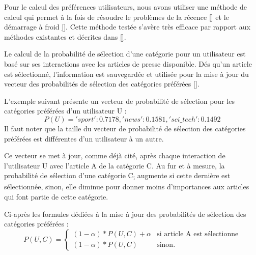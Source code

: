         Pour le calcul des préférences utilisateurs, nous avons utiliser une méthode de calcul qui permet à la fois de résoudre le problèmes de la récence \autoref{} et le démarrage à froid \autoref{}. Cette méthode testée s'avère très efficace par rapport aux méthodes existantes et décrites dans \autoref{}.

        Le calcul de la probabilité de sélection d'une catégorie pour un utilisateur est basé sur ses interactions avec les articles de presse disponible. Dés qu'un article est sélectionné, l'information est sauvegardée et utilisée pour la mise à jour du vecteur des probabilités de sélection des catégories préférées \autoref{}.

        L'exemple suivant présente un vecteur de probabilité de sélection pour les catégories préférées d'un utilisateur U :
            \[P(U) = {'sport': 0.7178, 'news': 0.1581, 'sci\_tech': 0.1492}\]            
        Il faut noter que la taille du vecteur de probabilité de sélection des catégories préférées est différentes d'un utilisateur à un autre.

        Ce vecteur se met à jour, comme déjà cité, après chaque interaction de l'utilisateur U avec l'article A de la catégorie C. Au fur et à mesure, la probabilité de sélection d'une catégorie C\textsubscript{i} augmente si cette dernière est sélectionnée, sinon, elle diminue pour donner moins d'importances aux articles qui font partie de cette catégorie.

        Ci-après les formules dédiées à la mise à jour des probabilités de sélection des catégories préférées :\\
            \[
            P(U, C) =
            \begin{cases}
                (1-{\alpha}) * {P(U, C)} + {\alpha} & \text{si } \text{article A est sélectionne} \\
                (1-{\alpha}) * {P(U, C)} & \text{sinon.}
            \end{cases}
            \]

